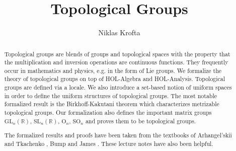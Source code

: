 \documentclass[11pt,a4paper]{article}
\begin{document}
\title{Topological Groups}
\author{Niklas Krofta}
\maketitle

\begin{abstract}
Topological groups are blends of groups and topological spaces with the property that the multiplication and inversion operations are continuous functions. 
They frequently occur in mathematics and physics, e.g. in the form of Lie groups. We formalize the theory of topological groups on top of 
HOL-Algebra and HOL-Analysis. Topological groups are defined via a locale. We also introduce a set-based notion of uniform spaces in order to define
the uniform structures of topological groups. The most notable formalized result is the Birkhoff-Kakutani theorem which characterizes 
metrizable topological groups. Our formalization also defines the important matrix groups $\text{GL}_n(\mathbb{R})$, $\text{SL}_n(\mathbb{R})$,
$\text{O}_n$, $\text{SO}_n$ and proves them to be topological groups. \newline

The formalized results and proofs have been taken from the textbooks of Arhangel’skii and Tkachenko \cite{topological_groups}, Bump \cite{lie_groups}
and James \cite{topological_and_uniform_spaces}. These lecture notes \cite{prem} have also been helpful.
\end{abstract}

\tableofcontents





\end{document}
